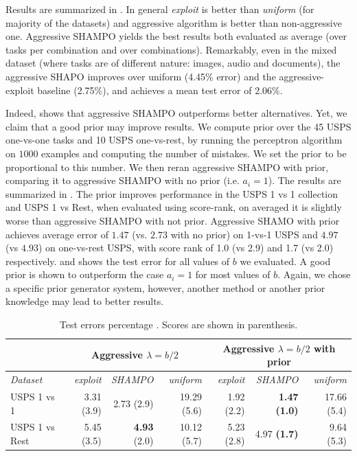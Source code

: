 Results  are summarized in .  In general {\em exploit} is better than {\em uniform}
 (for majority of the datasets) and aggressive algorithm is better than non-aggressive one. 
 Aggressive SHAMPO yields the best results both evaluated as average 
(over tasks per combination and over combinations). Remarkably, even in the mixed dataset 
(where tasks are of different nature: images, audio and documents), the aggressive SHAPO improves over 
uniform (4.45\% error) and the aggressive-exploit baseline (2.75\%), and achieves a mean test error of 2.06\%.

Indeed,  shows that aggressive SHAMPO outperforms better alternatives. Yet, we claim that a 
good prior may improve results. We compute prior over the 45 USPS one-vs-one tasks and 10 
USPS one-vs-rest, by running the perceptron algorithm on $1000$ examples and computing the number of mistakes.  
We set the prior to be proportional to this number. We then reran aggressive SHAMPO with prior, 
comparing it to aggressive SHAMPO with no prior (i.e. $a_i=1$). 
The results are summarized in . The prior improves performance in the USPS 1 vs 1 
collection and USPS 1 vs Rest, when evaluated using score-rank, on averaged it is slightly worse than 
aggressive SHAMPO with not prior.
Aggressive SHAMO with prior achieves average error of $1.47$ (vs. $2.73$ with no prior) on 1-vs-1 USPS 
and $4.97$ (vs $4.93$) on one-vs-rest USPS, with score rank of 1.0 (vs 2.9) and 1.7 (vs 2.0) respectively.
  and  shows the test error for all values of $b$ we evaluated.
A good prior is shown to outperform the case $a_i=1$ for most values of $b$. 
Again, we chose a specific prior generator system, however, another method or 
another prior knowledge may lead to better results.

 \begin{table}[h]
   \begin{centering}
 \caption{Test errors percentage . Scores are shown in parenthesis.}
 \label{tab:table2}
 {\scriptsize	
 \begin{tabular}{|l|r|r|r|r|r|r|}
 \hline
                         & \multicolumn{3}{c|}{\textbf{Aggressive $\lambda=b/2$}}           & \multicolumn{3}{c|}{\textbf{Aggressive $\lambda=b/2$ with prior}}  \\ \hline
 \textit{Dataset}        & \textit{exploit} & \textit{SHAMPO}     & \textit{uniform} & \textit{exploit} & \textit{SHAMPO}        & \textit{uniform} \\ \hline
 {USPS 1 vs 1}     & 3.31 (3.9)       & 2.73 (2.9)        & 19.29 (5.6)      & 1.92 (2.2)       & \textbf{1.47 (1.0)}    & 17.66 (5.4)      \\
 {USPS 1 vs Rest} & 5.45 (3.5)       & \textbf{4.93 }(2.0) & 10.12 (5.7)     & 5.23 (2.8)      & 4.97 \textbf{(1.7)} & 9.64 (5.3)      \\ \hline
 \end{tabular}
 }
 \end{centering}
 \end{table}
 
